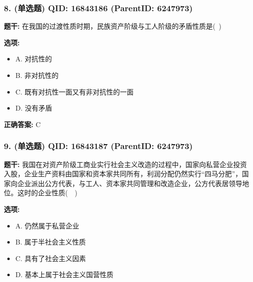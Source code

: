 \documentclass[12pt,UTF8]{ctexart}
\begin{document}
\vspace{0.3em}\hrulefill\vspace{0.7em}

\subsubsection*{8. (单选题) \small QID: 16843186 (ParentID: 6247973)}

\textbf{题干:}
在我国的过渡性质时期，民族资产阶级与工人阶级的矛盾性质是( )



\textbf{选项:}
\begin{itemize}[leftmargin=*]

  \item A. 对抗性的

  \item B. 非对抗性的

  \item C. 既有对抗性一面又有非对抗性的一面

  \item D. 没有矛盾

\end{itemize}

\textbf{正确答案:}
C

\vspace{0.3em}\hrulefill\vspace{0.7em}

\subsubsection*{9. (单选题) \small QID: 16843187 (ParentID: 6247973)}

\textbf{题干:}
我国在对资产阶级工商业实行社会主义改造的过程中，国家向私营企业投资入股，企业生产资料由国家和资本家共同所有，利润分配仍然实行“四马分肥”，国家向企业派出公方代表，与工人、资本家共同管理和改造企业，公方代表居领导地位。这时的企业性质(  )



\textbf{选项:}
\begin{itemize}[leftmargin=*]

  \item A. 仍然属于私营企业

  \item B. 属于半社会主义性质

  \item C. 具有了社会主义因素

  \item D. 基本上属于社会主义国营性质

\end{itemize}
\end{document}

